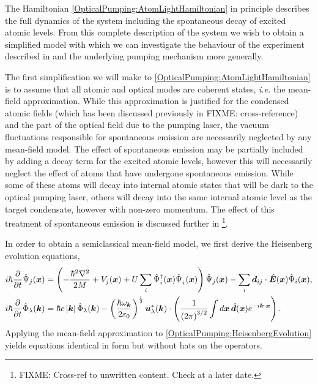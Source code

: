 The Hamiltonian \eqref{OpticalPumping:AtomLightHamiltonian} in principle describes the full dynamics of the system including the spontaneous decay of excited atomic levels.  From this complete description of the system we wish to obtain a simplified model with which we can investigate the behaviour of the experiment described in  and the underlying pumping mechanism more generally.  

The first simplification we will make to \eqref{OpticalPumping:AtomLightHamiltonian} is to assume that all atomic and optical modes are coherent states, \emph{i.e.} the mean-field approximation.  While this approximation is justified for the condensed atomic fields (which has been discussed previously in FIXME: cross-reference) and the part of the optical field due to the pumping laser, the vacuum fluctuations responsible for spontaneous emission are necessarily neglected by any mean-field model.  The effect of spontaneous emission may be partially included by adding a decay term for the excited atomic levels, however this will necessarily neglect the effect of atoms that have undergone spontaneous emission.  While some of these atoms will decay into internal atomic states that will be dark to the optical pumping laser, others will decay into the same internal atomic level as the target condensate, however with non-zero momentum.  The effect of this treatment of spontaneous emission is discussed further in \footnote{FIXME: Cross-ref to unwritten content.  Check at a later date.}.

In order to obtain a semiclassical mean-field model, we first derive the Heisenberg evolution equations,
\begin{subequations}
    \label{OpticalPumping:HeisenbergEvolution}
    \begin{align}
        i \hbar \frac{\partial}{\partial t} \hat{\Psi}_j(\bm{x}) &= \left(- \frac{\hbar^2 \nabla^2}{2 M} + V_j(\bm{x}) + U\sum_i\hat{\Psi}_i^\dagger(\bm{x})\hat{\Psi}_i^{\phantom{\dagger}}(\bm{x})\right)\hat{\Psi}_j(\bm{x}) - \sum_{i} \bm{d}_{ij} \cdot \hat{\bm{E}}(\bm{x}) \hat{\Psi}_i(\bm{x}),\\
        i \hbar \frac{\partial}{\partial t} \hat{\Phi}_\lambda(\bm{k}) &= \hbar c \abs{\bm{k}} \hat{\Phi}_\lambda(\bm{k}) - \left(\frac{\hbar \omega_{\bm{k}}}{2 \varepsilon_0}\right)^{\frac{1}{2}} \bm{u}_\lambda^*(\bm{k}) \cdot \left( \frac{1}{\left(2\pi\right)^{3/2}} \int d \bm{x}\, \hat{\bm{d}}(\bm{x}) e^{-i \bm{k} \cdot \bm{x}} \right).
    \end{align}
\end{subequations}
Applying the mean-field approximation to \eqref{OpticalPumping:HeisenbergEvolution} yields equations identical in form but without hats on the operators.

